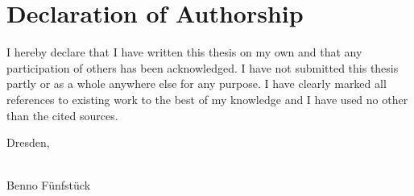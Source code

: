 \chapter*{Declaration of Authorship}

\narrower%
\narrower%
\noindent\Large
I hereby declare that I have written this thesis on my own and that any participation of others has been acknowledged.
I have not submitted this thesis partly or as a whole anywhere else for any purpose.
I have clearly marked all references to existing work to the best of my knowledge and I have used no other than the cited sources.
\normalsize

\vspace{1.5cm}

\noindent
\makeatletter
Dresden, \@date \hfill \begin{minipage}[t]{10em}{\vspace{1ex}\hrulefill\\\mbox{}\hfill{}Benno Fünfstück\hfill{}\mbox{}}\end{minipage}
\makeatother



